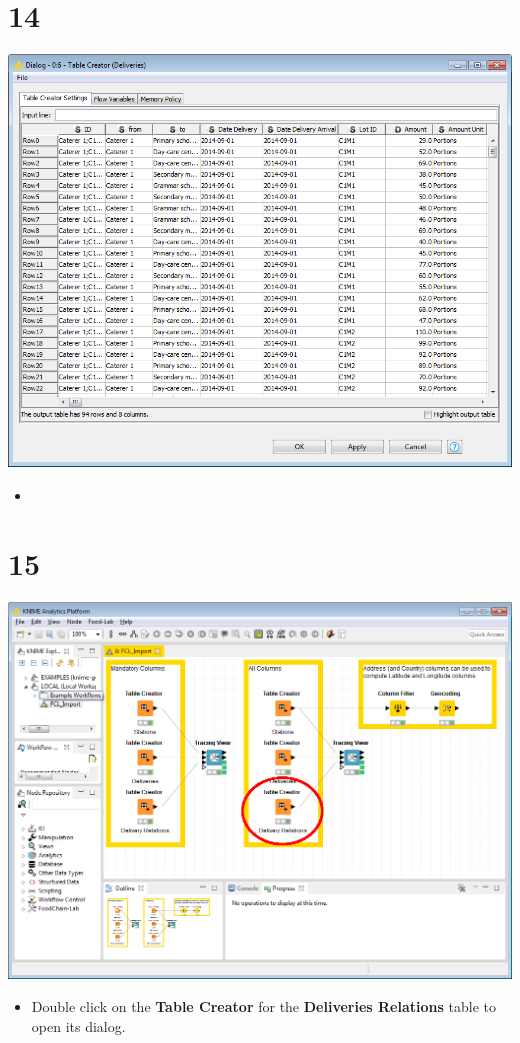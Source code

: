 \documentclass{beamer}
\begin{document}
\section{14}
\begin{frame}
	\begin{center}
  		\includegraphics[height=0.6\textheight]{14.png}
	\end{center}
	\begin{itemize}
		\item
	\end{itemize}
\end{frame}

\section{15}
\begin{frame}
	\begin{center}
  		\includegraphics[height=0.6\textheight]{15.png}
	\end{center}
	\begin{itemize}
		\item Double click on the \textbf{Table Creator} for the \textbf{Deliveries Relations} table to open its dialog.
	\end{itemize}
\end{frame}
\end{document}
